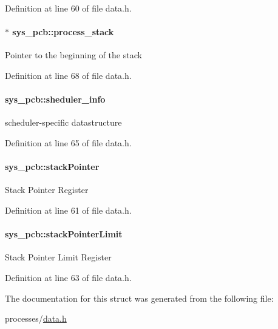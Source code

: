 Definition at line 60 of file data.\+h.

\hypertarget{structsys__pcb_a9ae44700870c76d5517c239ed30f7be0}{}
\paragraph[{process\+\_\+stack}]{$\ast$ sys\+\_\+pcb\+::process\+\_\+stack}\label{structsys__pcb_a9ae44700870c76d5517c239ed30f7be0}
Pointer to the beginning of the stack 

Definition at line 68 of file data.\+h.

\hypertarget{structsys__pcb_a590605cd2630ebc18d854f668a0696f2}{}
\paragraph[{sheduler\+\_\+info}]{ sys\+\_\+pcb\+::sheduler\+\_\+info}\label{structsys__pcb_a590605cd2630ebc18d854f668a0696f2}
scheduler-\/specific datastructure 

Definition at line 65 of file data.\+h.

\hypertarget{structsys__pcb_a02da00ceff54f8cc4dba8cfdb92094f6}{}
\paragraph[{stack\+Pointer}]{ sys\+\_\+pcb\+::stack\+Pointer}\label{structsys__pcb_a02da00ceff54f8cc4dba8cfdb92094f6}
Stack Pointer Register 

Definition at line 61 of file data.\+h.

\hypertarget{structsys__pcb_a0321026d7029970d2a9e2bf3ffc31763}{}
\paragraph[{stack\+Pointer\+Limit}]{ sys\+\_\+pcb\+::stack\+Pointer\+Limit}\label{structsys__pcb_a0321026d7029970d2a9e2bf3ffc31763}
Stack Pointer Limit Register 

Definition at line 63 of file data.\+h.



The documentation for this struct was generated from the following file\+:\begin{DoxyCompactItemize}
\item 
processes/\hyperlink{data_8h}{data.\+h}\end{DoxyCompactItemize}
